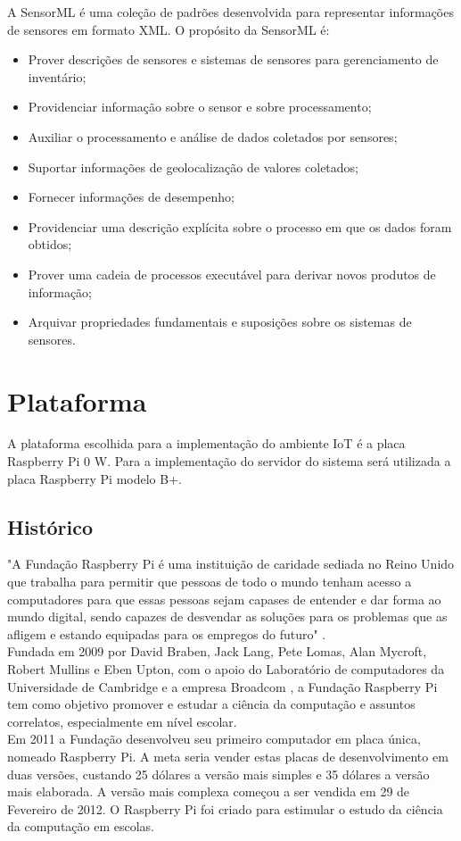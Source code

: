      \quad A \acrfull{SensorML} \cite{SML} é uma coleção de padrões
    desenvolvida para representar informações de sensores em formato XML. O propósito da \acrshort{SensorML} é:
    \begin{itemize}
      \item Prover descrições de sensores e sistemas de sensores para gerenciamento de inventário;
      \item Providenciar informação sobre o sensor e sobre processamento;
      \item Auxiliar o processamento e análise de dados coletados por sensores;
      \item Suportar informações de geolocalização de valores coletados;
      \item Fornecer informações de desempenho;
      \item Providenciar uma descrição explícita sobre o processo em que os dados foram obtidos;
      \item Prover uma cadeia de processos executável para derivar novos produtos de informação;
      \item Arquivar propriedades fundamentais e suposições sobre os sistemas de sensores.
    \end{itemize}
\section{Plataforma}
\quad A plataforma escolhida para a implementação do ambiente \acrlong{IoT} é a placa Raspberry Pi 0 W. Para a implementação do servidor do sistema
será utilizada a placa Raspberry Pi modelo B+.
\subsection{Histórico}
\quad "A Fundação Raspberry Pi é uma instituição de caridade sediada no Reino Unido que trabalha para permitir que pessoas de todo o mundo tenham acesso
a computadores para que essas pessoas sejam capases de entender e dar forma ao mundo digital, sendo capazes de desvendar as soluções para os
problemas que as afligem e estando equipadas para os empregos do futuro" \cite{rasp}.\\\null
\quad Fundada em 2009 por David Braben, Jack Lang, Pete Lomas, Alan Mycroft, Robert Mullins e Eben Upton, com o apoio do Laboratório de computadores da Universidade de Cambridge e a empresa Broadcom
, a Fundação Raspberry Pi tem como objetivo promover e estudar a ciência da computação e assuntos correlatos, especialmente em nível escolar.
\\\null \quad Em 2011 a Fundação desenvolveu seu primeiro computador em placa única, nomeado Raspberry Pi. A meta seria vender estas placas
de desenvolvimento em duas versões, custando 25 dólares a versão mais simples e 35 dólares a versão mais elaborada. A versão mais complexa começou a ser vendida
em 29 de Fevereiro de 2012. O Raspberry Pi foi criado para estimular o estudo da ciência da computação em escolas.
